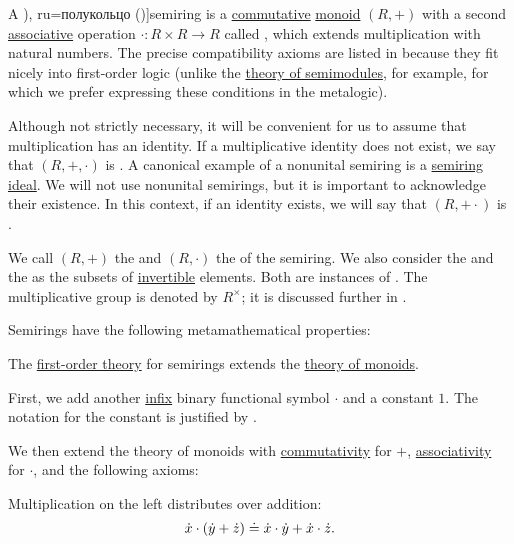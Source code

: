 \begin{definition}\label{def:semiring}
  A \term[ru=полупръстен (\cite[372]{ГеновМиховскиМоллов1991Алгебра}), ru=полукольцо (\cite[4]{ВечтомовПетров2022Полукольца})]{semiring} is a \hyperref[def:binary_operation/commutative]{commutative} \hyperref[def:monoid]{monoid} \( (R, +) \) with a second \hyperref[def:binary_operation/associative]{associative} operation \( \cdot: R \times R \to R \) called , which extends multiplication with natural numbers. The precise compatibility axioms are listed in  because they fit nicely into first-order logic (unlike the \hyperref[def:semimodule/theory]{theory of semimodules}, for example, for which we prefer expressing these conditions in the metalogic).

  Although not strictly necessary, it will be convenient for us to assume that multiplication has an identity. If a multiplicative identity does not exist, we say that \( (R, +, \cdot) \) is . A canonical example of a nonunital semiring is a \hyperref[def:semiring_ideal]{semiring ideal}. We will not use nonunital semirings, but it is important to acknowledge their existence. In this context, if an identity exists, we will say that \( (R, + \cdot) \) is .

  We call \( (R, +) \) the  and \( (R, \cdot) \) the  of the semiring. We also consider the  and the  as the subsets of \hyperref[def:monoid_inverse]{invertible} elements. Both are instances of . The multiplicative group is denoted by \( R^\times \); it is discussed further in .

  Semirings have the following metamathematical properties:
  \begin{thmenum}
     The \hyperref[def:first_order_theory]{first-order theory} for semirings extends the \hyperref[def:monoid/theory]{theory of monoids}.

    First, we add another \hyperref[rem:first_order_formula_conventions/infix]{infix} binary functional symbol \( \cdot \) and a constant \( 1 \). The notation for the constant is justified by .

    We then extend the theory of monoids with \hyperref[def:binary_operation/commutative]{commutativity} for \( + \), \hyperref[def:binary_operation/associative]{associativity} for \( \cdot \), and the following axioms:
    \begin{thmenum}
       Multiplication on the left distributes over addition:
      \begin{equation}\label{eq:def:semiring/left_distributivity}
        {\dot{x}} \cdot ({\dot{y}} + {\dot{z}}) \doteq {\dot{x}} \cdot {\dot{y}} + {\dot{x}} \cdot {\dot{z}}.
      \end{equation}


\end{thmenum}
\end{thmenum}
\end{definition}
